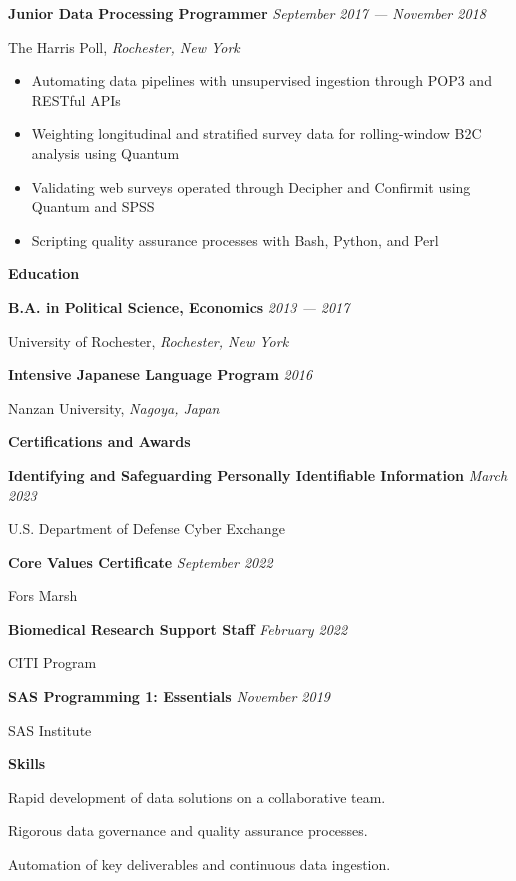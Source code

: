\documentclass[12pt]{article}
\begin{document}
\textbf{Junior Data Processing Programmer} \hfill \textit{September 2017 --- November 2018}
\par The Harris Poll, \textit{Rochester, New York}
\begin{itemize}[]
\item Automating data pipelines with unsupervised ingestion through POP3 and RESTful APIs
\item Weighting longitudinal and stratified survey data for rolling-window B2C analysis using Quantum
\item Validating web surveys operated through Decipher and Confirmit using Quantum and SPSS
\item Scripting quality assurance processes with Bash, Python, and Perl
\end{itemize}



\vspace{.5em}
\textbf{\Large Education} \hrulefill
\vspace{.5em}

\textbf{B.A. in Political Science, Economics} \hfill \textit{2013 --- 2017}
\par University of Rochester, \textit{Rochester, New York}

\vspace{.25em}
\textbf{Intensive Japanese Language Program} \hfill \textit{2016}
\par Nanzan University, \textit{Nagoya, Japan}



\vspace{.75em}
\textbf{\Large Certifications and Awards} \hrulefill
\vspace{.5em}

\textbf{Identifying and Safeguarding Personally Identifiable Information} \hfill \textit{March 2023}
\par U.S. Department of Defense Cyber Exchange

\vspace{.25em}
\textbf{Core Values Certificate} \hfill \textit{September 2022}
\par Fors Marsh

\vspace{.25em}
\textbf{Biomedical Research Support Staff} \hfill \textit{February 2022}
\par CITI Program

\vspace{.25em}
\textbf{SAS Programming 1: Essentials} \hfill \textit{November 2019}
\par SAS Institute



\vspace{.75em}
\textbf{\Large Skills} \hrulefill
\vspace{.5em}

Rapid development of data solutions on a collaborative team.

\vspace{.25em}
Rigorous data governance and quality assurance processes.

\vspace{.25em}
Automation of key deliverables and continuous data ingestion.
\end{document}
